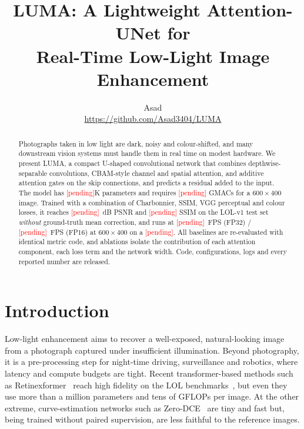 \documentclass[10pt,twocolumn,letterpaper]{article}
\title{\textbf{LUMA: A Lightweight Attention-UNet for\\Real-Time Low-Light Image Enhancement}}
\author{Asad\\\small\url{https://github.com/Asad3404/LUMA}}
\date{}
\newcommand{\pending}{\textcolor{red}{[pending]}}
\providecommand{\OursParamsK}{\pending}\providecommand{\OursParamsM}{\pending}
\providecommand{\OursMACs}{\pending}\providecommand{\OursMACsFHD}{\pending}
\providecommand{\OursFPS}{\pending}\providecommand{\OursFPSHalf}{\pending}
\providecommand{\GPUName}{\pending}
\providecommand{\OursPSNRLolVOne}{\pending}\providecommand{\OursSSIMLolVOne}{\pending}
\begin{document}
\maketitle

\begin{abstract}
Photographs taken in low light are dark, noisy and colour-shifted, and many
downstream vision systems must handle them in real time on modest hardware.
We present LUMA, a compact U-shaped convolutional network that combines
depthwise-separable convolutions, CBAM-style channel and spatial attention,
and additive attention gates on the skip connections, and predicts a
residual added to the input. The model has \OursParamsK{}K parameters and
requires \OursMACs{} GMACs for a $600\times400$ image. Trained with a
combination of Charbonnier, SSIM, VGG perceptual and colour losses, it reaches
\OursPSNRLolVOne{}~dB PSNR and \OursSSIMLolVOne{} SSIM on the LOL-v1 test
set \emph{without} ground-truth mean correction, and runs at
\OursFPS{}~FPS (FP32) / \OursFPSHalf{}~FPS (FP16) at $600\times400$ on a
\GPUName{}. All baselines are re-evaluated with identical metric code, and
ablations isolate the contribution of each attention component, each loss
term and the network width. Code, configurations, logs and every reported
number are released.
\end{abstract}

\section{Introduction}
Low-light enhancement aims to recover a well-exposed, natural-looking image
from a photograph captured under insufficient illumination. Beyond
photography, it is a pre-processing step for night-time driving, surveillance
and robotics, where latency and compute budgets are tight. Recent
transformer-based methods such as Retinexformer~\cite{cai2023retinexformer}
reach high fidelity on the LOL benchmarks~\cite{wei2018deep,yang2021sparse},
but even they use more than a million parameters and tens of GFLOPs per
image. At the other extreme, curve-estimation networks such as
Zero-DCE~\cite{guo2020zero,li2021learning} are tiny and fast but, being
trained without paired supervision, are less faithful to the reference images.
\end{document}
